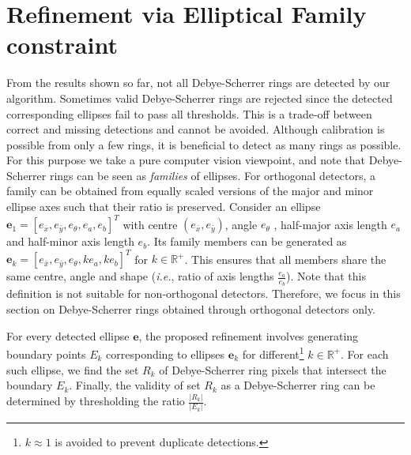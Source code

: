 \documentclass[preprint]{iucr}              %
\newcommand\dsr{Debye-Scherrer ring}
\newcommand\dsrs{Debye-Scherrer rings}
\begin{document}
\section{Refinement via Elliptical Family constraint}
\label{sec:family}
From the results shown so far, not all {\dsrs} are detected by our algorithm. Sometimes valid \dsrs{} are rejected since the detected corresponding ellipses fail to pass all thresholds. This is a trade-off between correct and missing detections and cannot be avoided. Although calibration is possible from only a few rings, it is beneficial to detect as many rings as possible. For this purpose we take a pure computer vision viewpoint, and note that {\dsrs} can be seen as \emph{families} of ellipses. For orthogonal detectors, a family can be obtained from equally scaled versions of the major and minor ellipse axes such that their ratio is preserved. Consider an ellipse $\mathbf{e}_1=\left[e_{\bar{x}},e_{\bar{y}},e_{\theta},e_a,e_b\right]^T$ with centre $(e_{\bar{x}},e_{\bar{y}})$, angle $e_\theta$ , half-major axis length $e_a$ and half-minor axis length $e_b$. Its family members can be generated as $\mathbf{e}_k=\left[e_{\bar{x}},e_{\bar{y}},e_{\theta},ke_a,ke_b\right]^T$ for $k\in\mathbb{R}^+$. 
This ensures that all members share the same centre, angle and shape (\emph{i.e.}, ratio of axis lengths $\frac{e_a}{e_b}$). Note that this definition is not suitable for non-orthogonal detectors. Therefore, we focus in this section on \dsrs{} obtained through orthogonal detectors only.

For every detected ellipse $\mathbf{e}$, the proposed refinement involves generating boundary points $E_k$ corresponding to ellipses $\mathbf{e}_k$ for different\footnote{$k\approx1$ is avoided to prevent duplicate detections.} $k\in\mathbb{R}^+$. For each such ellipse, we find the set $R_k$ of \dsr{} pixels that intersect the boundary $E_k$. Finally, the validity of set $R_k$ as a \dsr{} can be determined by thresholding the ratio $\frac{|R_k|}{|E_k|}$. %
\end{document}
